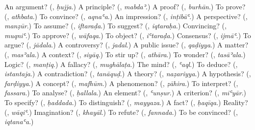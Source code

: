 \begin{tcolorbox}[breakable,colback=teal!4,colframe=teal!35!black,title={Before you move on}]
An argument? (\textbf{}, \emph{ḥujja}.) A principle? (\textbf{}, \emph{mabdaʾ}.) A proof? (\textbf{}, \emph{burhān}.) To prove? (\textbf{}, \emph{athbata}.) To convince? (\textbf{}, \emph{aqnaʿa}.) An impression? (\textbf{}, \emph{inṭibāʿ}.) A perspective? (\textbf{}, \emph{manẓūr}.) To assume? (\textbf{}, \emph{iftaraḍa}.) To suggest? (\textbf{}, \emph{iqtaraḥa}.) Convincing? (\textbf{}, \emph{muqniʿ}.) To approve? (\textbf{}, \emph{wāfaqa}.) To object? (\textbf{}, \emph{iʿtaraḍa}.) Consensus? (\textbf{}, \emph{ijmāʿ}.) To argue? (\textbf{}, \emph{jādala}.) A controversy? (\textbf{}, \emph{jadal}.) A public issue? (\textbf{}, \emph{qaḍiyya}.) A matter? (\textbf{}, \emph{masʾala}.) A context? (\textbf{}, \emph{siyāq}.) To stir up? (\textbf{}, \emph{athāra}.) To wonder? (\textbf{}, \emph{tasāʾala}.) Logic? (\textbf{}, \emph{manṭiq}.) A fallacy? (\textbf{}, \emph{mughālaṭa}.) The mind? (\textbf{}, \emph{ʿaql}.) To deduce? (\textbf{}, \emph{istantaja}.) A contradiction? (\textbf{}, \emph{tanāquḍ}.) A theory? (\textbf{}, \emph{naẓariyya}.) A hypothesis? (\textbf{}, \emph{farḍiyya}.) A concept? (\textbf{}, \emph{mafhūm}.) A phenomenon? (\textbf{}, \emph{ẓāhira}.) To interpret? (\textbf{}, \emph{fassara}.) To analyse? (\textbf{}, \emph{ḥallala}.) An element? (\textbf{}, \emph{ʿunṣur}.) A criterion? (\textbf{}, \emph{miʿyār}.) To specify? (\textbf{}, \emph{ḥaddada}.) To distinguish? (\textbf{}, \emph{mayyaza}.) A fact? (\textbf{}, \emph{ḥaqīqa}.) Reality? (\textbf{}, \emph{wāqiʿ}.) Imagination? (\textbf{}, \emph{khayāl}.) To refute? (\textbf{}, \emph{fannada}.) To be convinced? (\textbf{}, \emph{iqtanaʿa}.)
\end{tcolorbox}
